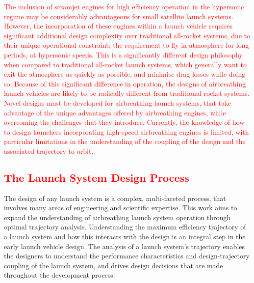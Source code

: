     \textcolor{red}{The inclusion of scramjet engines for high efficiency operation in the hypersonic regime may be considerably advantageous for small satellite launch systems. However, the incorporation of these engines within a launch vehicle requires significant additional design complexity over traditional all-rocket systems, due to their unique operational constraint; the requirement to fly in-atmosphere for long periods, at hypersonic speeds.
    This is a significantly different design philosophy when compared to traditional all-rocket launch systems, which generally want to exit the atmosphere as quickly as possible, and minimise drag losses while doing so. Because of this significant difference in operation, the designs of airbreathing launch vehicles are likely to be radically different from traditional rocket systems. Novel designs must be developed for airbreathing launch systems, that take advantage of the unique advantages offered by airbreathing engines, while overcoming the challenges that they introduce. 
    Currently, the knowledge of how to design launchers incorporating high-speed airbreathing engines is limited, with particular limitations in the understanding of the coupling of the design and the associated trajectory to orbit. 
    	}
    
    
    
    
    
    \textcolor{red}{
    	\section{The Launch System Design Process}
    }
    \noindent
    The design of any launch system is a complex, multi-faceted process, that involves many areas of engineering and scientific expertise. This work aims to expand the understanding of airbreathing launch system operation through optimal trajectory analysis. Understanding the maximum efficiency trajectory of a launch system and how this interacts with the design is an integral step in the early launch vehicle design. The analysis of a launch system's trajectory enables the designers to understand the performance characteristics and design-trajectory coupling of the launch system, and drives design decisions that are made throughout the development process. 
    
